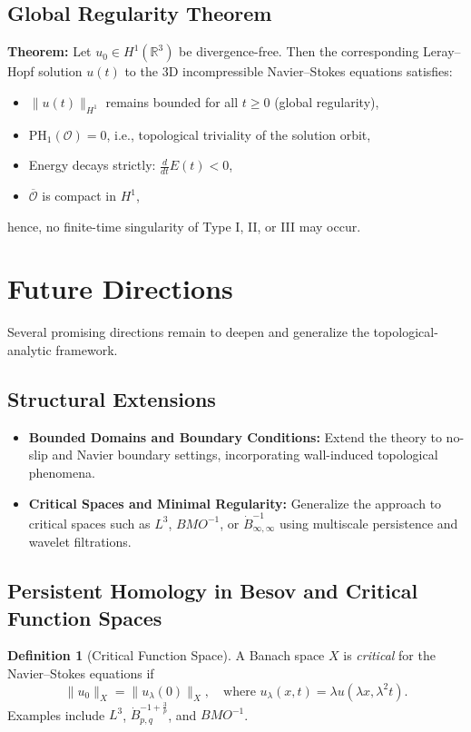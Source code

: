 \documentclass[11pt]{article}
\theoremstyle{definition}
\newtheorem{definition}[theorem]{Definition}
\begin{document}
\subsection*{Global Regularity Theorem}
\textbf{Theorem:} Let $u_0 \in H^1(\mathbb{R}^3)$ be divergence-free. Then the corresponding Leray--Hopf solution $u(t)$ to the 3D incompressible Navier--Stokes equations satisfies:
\begin{itemize}
  \item $\|u(t)\|_{H^1}$ remains bounded for all $t \ge 0$ (global regularity),
  \item $\mathrm{PH}_1(\mathcal{O}) = 0$, i.e., topological triviality of the solution orbit,
  \item Energy decays strictly: $\frac{d}{dt} E(t) < 0$,
  \item $\overline{\mathcal{O}}$ is compact in $H^1$,
\end{itemize}
\noindent hence, no finite-time singularity of Type I, II, or III may occur.

\section{Future Directions}
\label{sec:future}

Several promising directions remain to deepen and generalize the topological-analytic framework.

\subsection*{Structural Extensions}
\begin{itemize}
  \item \textbf{Bounded Domains and Boundary Conditions:} Extend the theory to no-slip and Navier boundary settings, incorporating wall-induced topological phenomena.
  \item \textbf{Critical Spaces and Minimal Regularity:} Generalize the approach to critical spaces such as $L^3$, $BMO^{-1}$, or $\dot{B}^{-1}_{\infty,\infty}$ using multiscale persistence and wavelet filtrations.
\end{itemize}

\subsection*{Persistent Homology in Besov and Critical Function Spaces}

\begin{definition}[Critical Function Space]
A Banach space $X$ is \emph{critical} for the Navier--Stokes equations if
\[
\|u_0\|_X = \|u_\lambda(0)\|_X, \quad \text{where } u_\lambda(x,t) = \lambda u(\lambda x, \lambda^2 t).
\]
Examples include $L^3$, $\dot{B}^{-1+\frac{3}{p}}_{p,q}$, and $BMO^{-1}$.
\end{definition}
\end{document}
